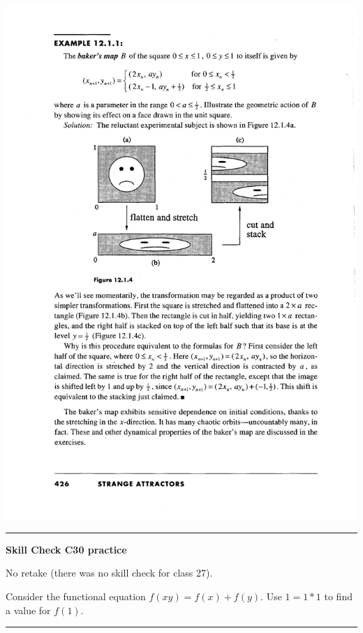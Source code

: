 \documentclass[12pt,letterpaper,noanswers]{exam}
\begin{document}
\includegraphics[scale=1]{img/C25baker.pdf}

\vspace{0.2cm}
\hrule
\vspace{0.2cm}

\noindent\textbf{Skill Check C30 practice}
\begin{questions}
\item No retake (there was no skill check for class 27).

\item Consider the functional equation $f(xy) = f(x) + f(y)$.  Use $1 = 1*1$ to find a value for $f(1)$.
\end{questions}

\vspace{0.2cm}

\hrule
\vspace{0.2cm}
\end{document}
